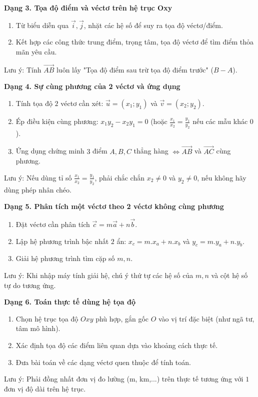 \textbf{Dạng 3. Tọa độ điểm và véctơ trên hệ trục Oxy}
\begin{enumerate}
\item Từ biểu diễn qua $\vec{i}, \vec{j}$, nhặt các hệ số để suy ra tọa độ véctơ/điểm.
\item Kết hợp các công thức trung điểm, trọng tâm, tọa độ véctơ để tìm điểm thỏa mãn yêu cầu.
\end{enumerate}
Lưu ý: Tính $\overrightarrow{AB}$ luôn lấy "Tọa độ điểm sau trừ tọa độ điểm trước" ($B - A$).

\textbf{Dạng 4. Sự cùng phương của 2 véctơ và ứng dụng}
\begin{enumerate}
\item Tính tọa độ $2$ véctơ cần xét: $\vec{u} = (x_1; y_1)$ và $\vec{v} = (x_2; y_2)$.
\item Ép điều kiện cùng phương: $x_1 y_2 - x_2 y_1 = 0$ (hoặc $\frac{x_1}{x_2} = \frac{y_1}{y_2}$ nếu các mẫu khác $0$).
\item Ứng dụng chứng minh $3$ điểm $A, B, C$ thẳng hàng $\Leftrightarrow \overrightarrow{AB}$ và $\overrightarrow{AC}$ cùng phương.
\end{enumerate}
Lưu ý: Nếu dùng tỉ số $\frac{x_1}{x_2} = \frac{y_1}{y_2}$, phải chắc chắn $x_2 \neq 0$ và $y_2 \neq 0$, nếu không hãy dùng phép nhân chéo.

\textbf{Dạng 5. Phân tích một véctơ theo 2 véctơ không cùng phương}
\begin{enumerate}
\item Đặt véctơ cần phân tích $\vec{c} = m\vec{a} + n\vec{b}$.
\item Lập hệ phương trình bậc nhất $2$ ẩn: $x_c = m.x_a + n.x_b$ và $y_c = m.y_a + n.y_b$.
\item Giải hệ phương trình tìm cặp số $m, n$.
\end{enumerate}
Lưu ý: Khi nhập máy tính giải hệ, chú ý thứ tự các hệ số của $m, n$ và cột hệ số tự do tương ứng.

\textbf{Dạng 6. Toán thực tế dùng hệ tọa độ}
\begin{enumerate}
\item Chọn hệ trục tọa độ $Oxy$ phù hợp, gắn gốc $O$ vào vị trí đặc biệt (như ngã tư, tâm mô hình).
\item Xác định tọa độ các điểm liên quan dựa vào khoảng cách thực tế.
\item Đưa bài toán về các dạng véctơ quen thuộc để tính toán.
\end{enumerate}
Lưu ý: Phải đồng nhất đơn vị đo lường (m, km,...) trên thực tế tương ứng với $1$ đơn vị độ dài trên hệ trục.

